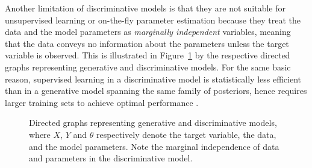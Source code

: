 \documentclass[english]{scrartcl}
\begin{document}
Another limitation of discriminative models is that they are not suitable for unsupervised learning or on-the-fly parameter estimation because they treat the data and the model parameters as {\em marginally independent} variables, meaning that the data conveys no information about the parameters unless the target variable is observed. This is illustrated in Figure~\ref{fig:graph_comparison} by the respective directed graphs representing generative and discriminative models. For the same basic reason, supervised learning in a discriminative model is statistically less efficient than in a generative model spanning the same family of posteriors, hence requires larger training sets to achieve optimal performance \cite{Ng-01}. 



\begin{figure}[!ht]
\begin{center}
\hspace*{.2\textwidth}
\caption{Directed graphs representing generative and discriminative models, where $X$, $Y$ and $\theta$ respectively denote the target variable, the data, and the model parameters. Note the marginal independence of data and parameters in the discriminative model.}
\label{fig:graph_comparison}
\end{center}
\end{figure}
\end{document}
